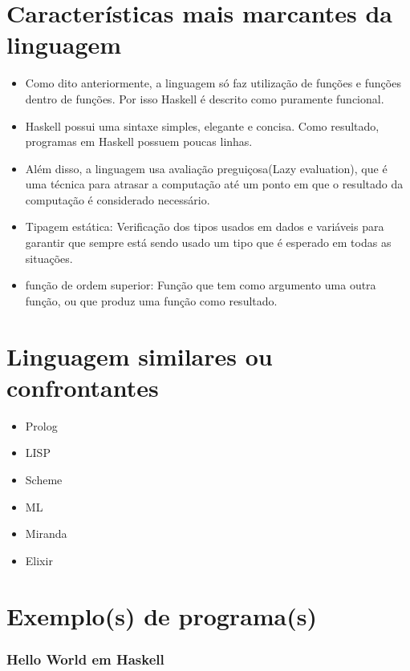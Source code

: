 \documentclass[
	article,			%
	11pt,				%
	oneside,			%
	a4paper,			%
	english,			%
	brazil,				%
	sumario=tradicional
	]{abntex2}
\begin{document}
    \chapter{Características mais marcantes da linguagem}

    \begin{itemize}
      \item Como dito anteriormente, a linguagem só faz utilização de funções e funções dentro de funções. Por isso
      Haskell é descrito como puramente funcional.
      \item Haskell possui uma sintaxe simples, elegante e concisa. Como resultado, programas em Haskell possuem 
      poucas linhas. 
      \item Além disso, a linguagem usa avaliação preguiçosa(Lazy evaluation), que é uma técnica para atrasar a computação 
      até um ponto em que o resultado da computação é considerado necessário.
      \item Tipagem estática: Verificação dos tipos usados em dados e variáveis para 
      garantir que sempre está sendo usado um tipo que é esperado em todas as situações. 
      \item função de ordem superior: Função que tem como argumento uma outra função, ou que produz 
      uma função como resultado.
    \end{itemize}

    \chapter{Linguagem similares ou confrontantes}

    \begin{itemize}
      \item Prolog
      \item LISP 
      \item Scheme 
      \item ML 
      \item Miranda 
      \item Elixir 
    \end{itemize}

    \chapter{Exemplo(s) de programa(s)}

    \subsection*{Hello World em Haskell}
      
\end{document}
